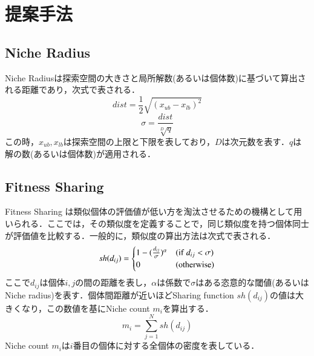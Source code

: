 \documentclass[twocolumn, a4paper]{UECIEresume}
\begin{document}
\section{提案手法}
\subsection{Niche Radius}
\label{ss:nr}
Niche Radiusは探索空間の大きさと局所解数(あるいは個体数)に基づいて算出される距離であり，次式で表される．
\begin{equation}
\label{eq:nr-d}
dist=\frac{1}{2}\sqrt{(x_{ub}-x_{lb})^2}
\end{equation}
\begin{equation}
\label{eq:nr-s}
\sigma=\frac{dist}{\sqrt[D]{q}}
\end{equation}
この時，$x_{ub},x_{lb}$は探索空間の上限と下限を表しており，$D$は次元数を表す．$q$は解の数(あるいは個体数)が適用される．

\subsection{Fitness Sharing}
\label{ss:fs}
Fitness Sharing \cite{FS} は類似個体の評価値が低い方を淘汰させるための機構として用いられる．ここでは，その類似度を定義することで，同じ類似度を持つ個体同士が評価値を比較する．一般的に，類似度の算出方法は次式で表される．
\begin{equation}
\label{eq:sfunc}
sh(d_{ij})= \begin{cases}
1-(\frac{d_{ij}}{\sigma})^\alpha & ({\rm if} \ d_{ij} < \sigma)\\
0 & ({\rm otherwise})
\end{cases}
\end{equation}
ここで$d_{ij}$は個体$i,j$の間の距離を表し，$\alpha$は係数で$\sigma$はある恣意的な閾値(あるいはNiche radius)を表す．個体間距離が近いほどSharing function $sh(d_{ij})$の値は大きくなり，この数値を基にNiche count $m_i$を算出する．
\begin{equation}
\label{eq:nc}
m_i=\sum_{j=1}^N sh(d_{ij})
\end{equation}
Niche count $m_i$は$i$番目の個体に対する全個体の密度を表している．
\end{document}
